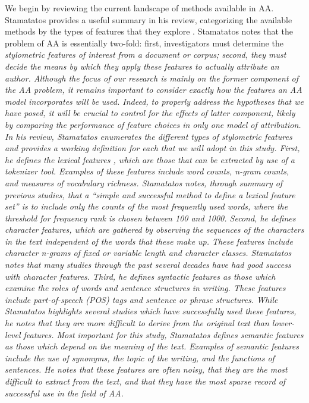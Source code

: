 \documentclass[11pt,a4paper]{article}
\begin{document}
We begin by reviewing the current landscape of methods available in AA. Stamatatos provides a useful summary in his review, categorizing the available methods by the types of features that they explore \citeyearpar{Stamatatos2009}. Stamatatos notes that the problem of AA is essentially two-fold: first, investigators must determine the \em stylometric features \em of interest from a document or corpus; second, they must decide the means by which they apply these features to actually attribute an author. Although the focus of our research is mainly on the former component of the AA problem, it remains important to consider exactly how the features an AA model incorporates will be used. Indeed, to properly address the hypotheses that we have posed, it will be crucial to control for the effects of latter component, likely by comparing the performance of feature choices in only one model of attribution. \\
In his review, Stamatatos enumerates the different types of stylometric features and provides a working definition for each that we will adopt in this study. First, he defines the \em lexical features \em, which are those that can be extracted by use of a tokenizer tool. Examples of these features include word counts, n-gram counts, and measures of vocabulary richness. Stamatatos notes, through summary of previous studies, that a ``simple and successful method to define a lexical feature set'' \cite{Stamatatos2009} is to include only the counts of the most frequently used words, where the threshold for frequency rank is chosen between 100 and 1000. Second, he defines \em character features, \em which are gathered by observing the sequences of the characters in the text independent of the words that these make up. These features  include character n-grams of fixed or variable length and character classes. Stamatatos notes that many studies through the past several decades have had good success with character features. Third, he defines \em syntactic features \em as those which examine the roles of words and sentence structures in writing. These features include part-of-speech (POS) tags and sentence or phrase structures. While Stamatatos highlights several studies which have successfully used these features, he notes that they are more difficult to derive from the original text than lower-level features. Most important for this study, Stamatatos defines \em semantic features \em as those which depend on the meaning of the text. Examples of semantic features include the use of synonyms, the topic of the writing, and the functions of sentences. He notes that these features are often noisy, that they are the most difficult to extract from the text, and that they have the most sparse record of successful use in the field of AA. \\
\end{document}
